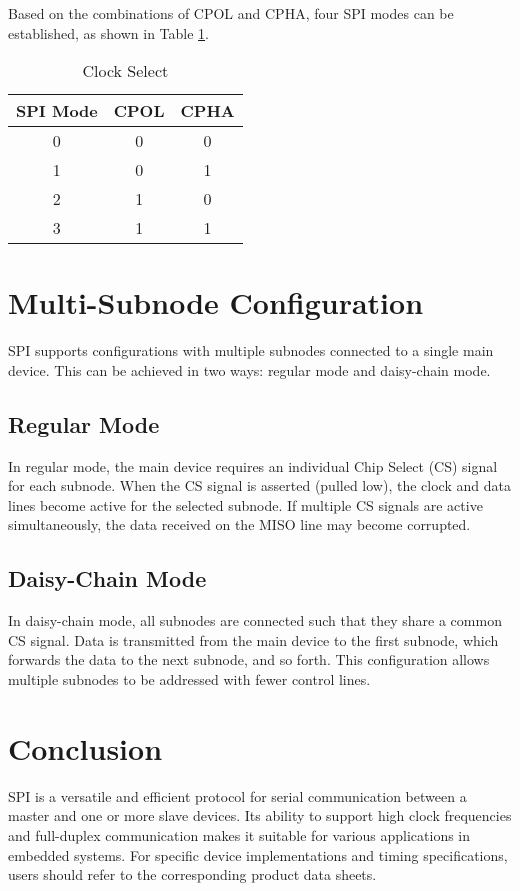 \documentclass{article}
\begin{document}
Based on the combinations of CPOL and CPHA, four SPI modes can be established, as shown in Table \ref{tab:spi_modes}.

\begin{table}[h]
    \centering
    \caption{Clock Select}
    \begin{tabular}{@{}ccc@{}}
        \toprule
        \textbf{SPI Mode} & \textbf{CPOL} & \textbf{CPHA} \\ \midrule
        0                  & 0             & 0             \\
        1                  & 0             & 1             \\
        2                  & 1             & 0             \\
        3                  & 1             & 1             \\ \bottomrule
    \end{tabular}
    \label{tab:spi_modes}
\end{table}


\section{Multi-Subnode Configuration}
SPI supports configurations with multiple subnodes connected to a single main device. This can be achieved in two ways: regular mode and daisy-chain mode.

\subsection{Regular Mode}
In regular mode, the main device requires an individual Chip Select (CS) signal for each subnode. When the CS signal is asserted (pulled low), the clock and data lines become active for the selected subnode. If multiple CS signals are active simultaneously, the data received on the MISO line may become corrupted.

\subsection{Daisy-Chain Mode}
In daisy-chain mode, all subnodes are connected such that they share a common CS signal. Data is transmitted from the main device to the first subnode, which forwards the data to the next subnode, and so forth. This configuration allows multiple subnodes to be addressed with fewer control lines.

\section{Conclusion}
SPI is a versatile and efficient protocol for serial communication between a master and one or more slave devices. Its ability to support high clock frequencies and full-duplex communication makes it suitable for various applications in embedded systems. For specific device implementations and timing specifications, users should refer to the corresponding product data sheets.
\end{document}
